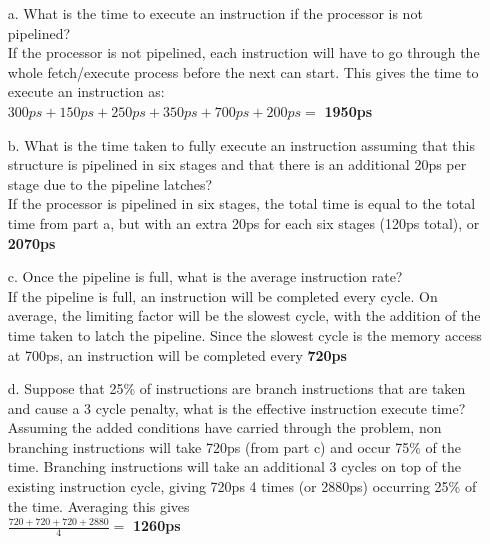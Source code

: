 \documentclass[letterpaper,10pt,onecolumn,titlepage]{article}
\begin{document}
\begin{enumerate}
	\begin{enumerate}
		\item[a.] What is the time to execute an instruction if the processor is
			not pipelined? \\
			If the processor is not pipelined, each instruction will have to
			go through the whole fetch/execute process before the next can
			start. This gives the time to execute an instruction as: \\
			$300ps + 150ps + 250ps + 350ps + 700ps + 200ps =$ \textbf{1950ps}
		\item[b.] What is the time taken to fully execute an instruction assuming
			that this structure is pipelined in six stages and that there is an
			additional 20ps per stage due to the pipeline latches?\\
			If the processor is pipelined in six stages, the total time is
			equal to the total time from part a, but with an extra 20ps for
			each six stages (120ps total), or \textbf{2070ps}
		\item[c.] Once the pipeline is full, what is the average instruction
			rate?\\
			If the pipeline is full, an instruction will be completed every
			cycle. On average, the limiting factor will be the slowest cycle,
			with the addition of the time taken to latch the pipeline.
			Since the slowest cycle is the memory access at 700ps, an 
			instruction will be completed every \textbf{720ps}
		\item[d.] Suppose that 25\% of instructions are branch instructions that
			are taken and cause a 3 cycle penalty, what is the effective
			instruction execute time?\\
			Assuming the added conditions have carried through the problem,
			non branching instructions will take 720ps (from part c) and occur
			75\% of the time. Branching instructions will take an additional 3
			cycles on top of the existing instruction cycle, giving 720ps 4
			times (or 2880ps) occurring 25\% of the time. Averaging this
			gives\\
			$\frac{720+720+720+2880}{4} =$ \textbf{1260ps}
	\end{enumerate}


\end{enumerate}
\end{document}
